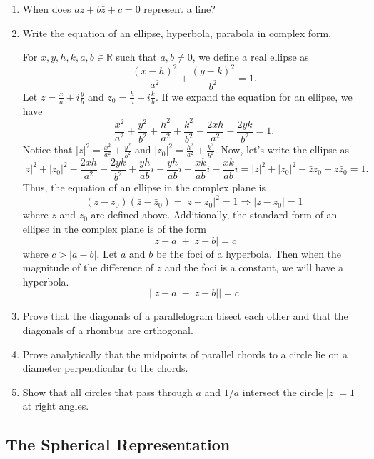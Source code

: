 \begin{enumerate}
\item
  When does \(az + b\bar{z} + c = 0\) represent a line?
\item
  Write the equation of an ellipse, hyperbola, parabola in complex form.
  \par\smallskip
  For \(x,y,h,k,a,b\in\mathbb{R}\) such that \(a,b\neq 0\), we define a real
  ellipse as
  \[
  \frac{(x - h)^2}{a^2} + \frac{(y - k)^2}{b^2} = 1.
  \]
  Let \(z = \frac{x}{a} + i\frac{y}{b}\) and
  \(z_0 = \frac{h}{a} + i\frac{k}{b}\).
  If we expand the equation for an ellipse, we have
  \[
  \frac{x^2}{a^2} + \frac{y^2}{b^2} + \frac{h^2}{a^2} + \frac{k^2}{b^2} -
  \frac{2xh}{a^2} - \frac{2yk}{b^2} = 1.
  \]
  Notice that \(\lvert z\rvert^2 = \frac{x^2}{a^2} + \frac{y^2}{b^2}\) and
  \(\lvert z_0\rvert^2 = \frac{h^2}{a^2} + \frac{k^2}{b^2}\).
  Now, let's write the ellipse as
  \[
  \lvert z\rvert^2 + \lvert z_0\rvert^2 - \frac{2xh}{a^2} - \frac{2yk}{b^2} +
  \frac{yh}{ab}i - \frac{yh}{ab}i + \frac{xk}{ab}i - \frac{xk}{ab}i =
  \lvert z\rvert^2 + \lvert z_0\rvert^2 - \bar{z}z_0 - z\bar{z}_0 = 1.
  \]
  Thus, the equation of an ellipse in the complex plane is
  \[
  (z - z_0)(\bar{z} - \bar{z}_0) = \lvert z - z_0\rvert^2 = 1\Rightarrow
  \lvert z - z_0\rvert = 1
  \]
  where \(z\) and \(z_0\) are defined above.
  Additionally, the standard form of an ellipse in the complex plane is of the
  form
  \[
  \lvert z - a\rvert + \lvert z - b\rvert = c
  \]
  where \(c > \lvert a - b\rvert\).
  Let \(a\) and \(b\) be the foci of a hyperbola.
  Then when the magnitude of the difference of \(z\) and the foci is a constant, we will have a hyperbola.
  \[
  \bigl\lvert\lvert z - a\rvert - \lvert z - b\rvert\bigr\rvert = c
  \]
\item
  Prove that the diagonals of a parallelogram bisect each other and that the
  diagonals of a rhombus are orthogonal.
\item
  Prove analytically that the midpoints of parallel chords to a circle lie on a
  diameter perpendicular to the chords.
\item
  Show that all circles that pass through \(a\) and \(1/\bar{a}\) intersect the
  circle \(\lvert z\rvert = 1\) at right angles.
\end{enumerate}

\subsection{The Spherical Representation}

